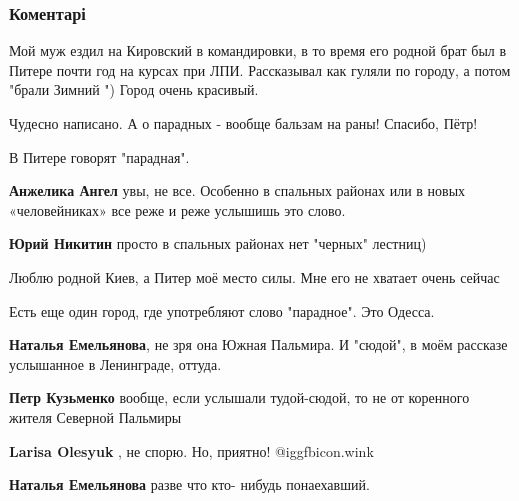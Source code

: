  
 
 
 
 
\subsubsection{Коментарі}

\begin{itemize} %

Мой муж ездил на Кировский в командировки, в то время его родной брат был в
Питере почти год на курсах при ЛПИ. Рассказывал как гуляли по городу, а потом
"брали Зимний ") Город очень красивый.



Чудесно написано. А о парадных - вообще бальзам на раны! Спасибо, Пётр!

В Питере говорят "парадная".

\begin{itemize} %
\textbf{Анжелика Ангел} увы, не все. Особенно в спальных районах или в новых «человейниках» все реже и реже услышишь это слово.

\textbf{Юрий Никитин} просто в спальных районах нет "черных" лестниц)
\end{itemize} %

Люблю родной Киев, а Питер моё место силы. Мне его не хватает очень сейчас

Есть еще один город, где употребляют слово "парадное". Это Одесса.

\begin{itemize} %
\textbf{Наталья Емельянова}, не зря она Южная Пальмира. И "сюдой", в моём рассказе услышанное в Ленинграде, оттуда.

\textbf{Петр Кузьменко} вообще, если услышали тудой-сюдой, то не от коренного жителя Северной Пальмиры

\textbf{Larisa Olesyuk} , не спорю. Но, приятно! @igg{fbicon.wink} 

\textbf{Наталья Емельянова} разве что кто- нибудь понаехавший.


\end{itemize}
\end{itemize}
